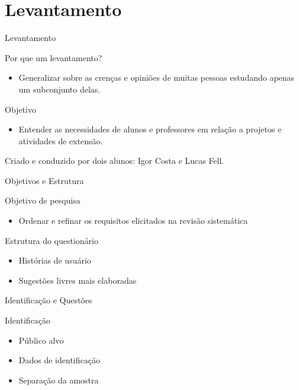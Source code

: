 \section{Levantamento}

\begin{frame}{{\sffamily Levantamento}}
  \begin{block}{Por que um levantamento?}
    \begin{itemize}
      \item Generalizar sobre as crenças e opiniões de muitas pessoas estudando apenas um subconjunto delas.
    \end{itemize}
  \end{block}
  \begin{block}{Objetivo}
    \begin{itemize}
      \item Entender as necessidades de alunos e professores em relação a projetos e atividades de extensão.
    \end{itemize}
  \end{block}
  Criado e conduzido por dois alunos: Igor Costa e Lucas Fell.
\end{frame}

\begin{frame}{{\sffamily Objetivos e Estrutura}}
  \begin{block}{Objetivo de pesquisa}
    \begin{itemize}
      \item Ordenar e refinar os requisitos elicitados na revisão sistemática
    \end{itemize}
  \end{block}
  \begin{block}{Estrutura do questionário}
    \begin{itemize}
      \item Histórias de usuário
      \item Sugestões livres mais elaboradas
    \end{itemize}
  \end{block}
\end{frame}

\begin{frame}{{\sffamily Identificação e Questões}}
  \begin{block}{Identificação}
    \begin{itemize}
      \item Público alvo
      \item Dados de identificação
      \item Separação da amostra
    \end{itemize}
  \end{block}
\end{frame}

